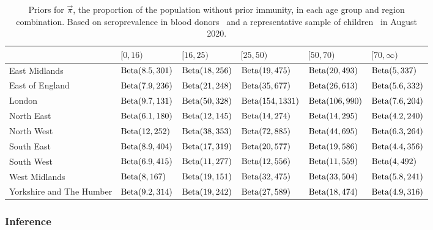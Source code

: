\documentclass[thesis.tex]{subfiles}
\begin{document}
\begin{landscape}
\begin{table}
\centering
\begin{tabular}{l|lllll}
         & $[0,16)$ & $[16,25)$ & $[25,50)$ & $[50,70)$ & $[70,\infty)$ \\
        \hline
        East Midlands & $\operatorname{Beta}(8.5, 301)$ & $\operatorname{Beta}(18, 256)$ & $\operatorname{Beta}(19, 475)$ & $\operatorname{Beta}(20, 493)$ & $\operatorname{Beta}(5, 337)$ \\
        East of England & $\operatorname{Beta}(7.9, 236)$ & $\operatorname{Beta}(21, 248)$ & $\operatorname{Beta}(35, 677)$ & $\operatorname{Beta}(26, 613)$ & $\operatorname{Beta}(5.6, 332)$ \\
        London & $\operatorname{Beta}(9.7, 131)$ & $\operatorname{Beta}(50, 328)$ & $\operatorname{Beta}(154, 1331)$ & $\operatorname{Beta}(106, 990)$ & $\operatorname{Beta}(7.6, 204)$ \\
        North East & $\operatorname{Beta}(6.1, 180)$ & $\operatorname{Beta}(12, 145)$ & $\operatorname{Beta}(14, 274)$ & $\operatorname{Beta}(14, 295)$ & $\operatorname{Beta}(4.2, 240)$ \\
        North West & $\operatorname{Beta}(12, 252)$ & $\operatorname{Beta}(38, 353)$ & $\operatorname{Beta}(72, 885)$ & $\operatorname{Beta}(44, 695)$ & $\operatorname{Beta}(6.3, 264)$ \\
        South East & $\operatorname{Beta}(8.9, 404)$ & $\operatorname{Beta}(17, 319)$ & $\operatorname{Beta}(20, 577)$ & $\operatorname{Beta}(19, 586)$ & $\operatorname{Beta}(4.4, 356)$ \\
        South West & $\operatorname{Beta}(6.9, 415)$ & $\operatorname{Beta}(11, 277)$ & $\operatorname{Beta}(12, 556)$ & $\operatorname{Beta}(11, 559)$ & $\operatorname{Beta}(4, 492)$ \\
        West Midlands & $\operatorname{Beta}(8, 167)$ & $\operatorname{Beta}(19, 151)$ & $\operatorname{Beta}(32, 475)$ & $\operatorname{Beta}(33, 504)$ & $\operatorname{Beta}(5.8, 241)$ \\
        Yorkshire and The Humber & $\operatorname{Beta}(9.2, 314)$ & $\operatorname{Beta}(19, 242)$ & $\operatorname{Beta}(27, 589)$ & $\operatorname{Beta}(18, 474)$ & $\operatorname{Beta}(4.9, 316)$ \\
    \end{tabular}
\caption{Priors for $\vec{\pi}$, the proportion of the population without prior immunity, in each age group and region combination. Based on seroprevalence in blood donors~\autocite{amirthalingamSeroprevalence} and a representative sample of children~\autocite{ratcliffeCommunity} in August 2020.}
\label{SEIR:table:immunity-prior}
\end{table}
\end{landscape}

\subsubsection{Inference} \label{SEIR:sec:MCMC}
\end{document}
